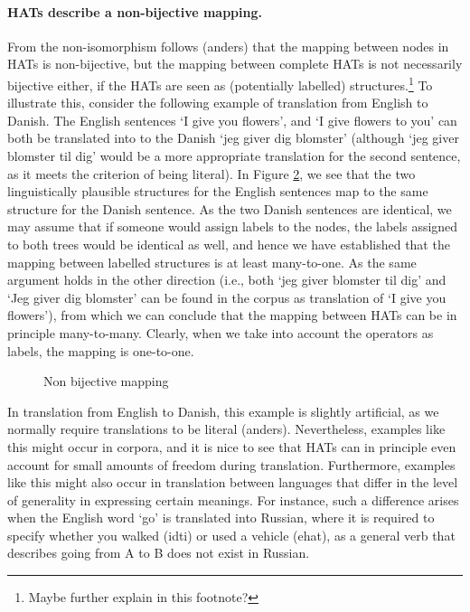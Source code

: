 \documentclass[a4paper, 11pt]{report}
\newcommand\textcyr[1]{{\fontencoding{OT2}\fontfamily{wncyr}\selectfont #1}}
\theoremstyle{definition}
\theoremstyle{plain}
\begin{document}
\begin{figure}
\caption{}\label{fig:nepas}
\end{figure}

\paragraph{HATs describe a non-bijective mapping.} From the non-isomorphism follows (anders) that the mapping between nodes in HATs is non-bijective, but the mapping between complete HATs is not necessarily bijective either, if the HATs are seen as (potentially labelled) structures.\footnote{Maybe further explain in this footnote?} To illustrate this, consider the following example of translation from English to Danish. The English sentences `I give you flowers', and `I give flowers to you' can both be translated into to the Danish `jeg giver dig blomster' (although `jeg giver blomster til dig' would be a more appropriate translation for the second sentence, as it meets the criterion of being literal). In Figure \ref{fig:nonbij}, we see that the two linguistically plausible structures for the English sentences map to the same structure for the Danish sentence. As the two Danish sentences are identical, we may assume that if someone would assign labels to the nodes, the labels assigned to both trees would be identical as well, and hence we have established that the mapping between labelled structures is at least many-to-one. As the same argument holds in the other direction (i.e., both `jeg giver blomster til dig' and `Jeg giver dig blomster' can be found in the corpus as translation of `I give you flowers'), from which we can conclude that the mapping between HATs can be in principle many-to-many. Clearly, when we take into account the operators as labels, the mapping is one-to-one. 

\begin{figure}
\caption{Non bijective mapping}\label{fig:nonbij}
\end{figure}

In translation from English to Danish, this example is slightly artificial, as we normally require translations to be literal (anders). Nevertheless, examples like this might occur in corpora, and it is nice to see that HATs can in principle even account for small amounts of freedom during translation. Furthermore, examples like this might also occur in translation between languages that differ in the level of generality in expressing certain meanings. For instance, such a difference arises when the English word `go' is translated into Russian, where it is required to specify whether you walked (\textcyr{idti}) or used a vehicle (\textcyr{ehat}), as a general verb that describes going from A to B does not exist in Russian.
\end{document}
